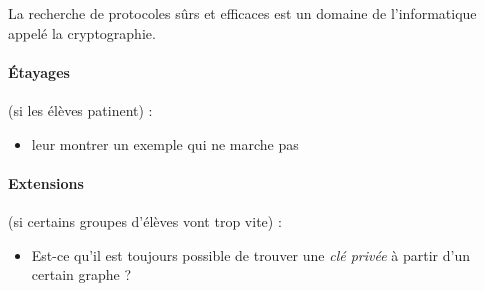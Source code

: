 \documentclass[12pt, a4paper]{article}
\begin{document}
	La recherche de protocoles sûrs et efficaces est un domaine de l'informatique appelé la cryptographie.
	
	\paragraph*{Étayages} (si les élèves patinent) :
	\begin{itemize}
		\item leur montrer un exemple qui ne marche pas
	\end{itemize}
	
	\paragraph*{Extensions} (si certains groupes d'élèves vont trop vite) :
	\begin{itemize}
		\item Est-ce qu'il est toujours possible de trouver une \textit{clé privée} à partir d'un certain graphe ?
	\end{itemize}
\end{document}
